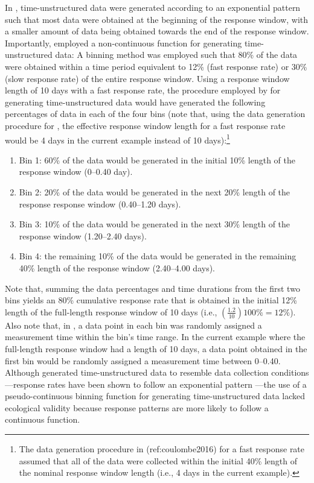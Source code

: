 \documentclass[
12pt, %
twoside,
english]{guelphthesis}
\begin{document}
In \textcite{coulombe2016}, time-unstructured data were generated according to an exponential pattern such that most data were obtained at the beginning of the response window, with a smaller amount of data being obtained towards the end of the response window. Importantly, \textcite{coulombe2016} employed a non-continuous function for generating time-unstructured data: A binning method was employed such that 80\% of the data were obtained within a time period equivalent to 12\% (fast response rate) or 30\% (slow response rate) of the entire response window. Using a response window length of 10 days with a fast response rate, the procedure employed by \textcite{coulombe2016} for generating time-unstructured data would have generated the following percentages of data in each of the four bins (note that, using the data generation procedure for \textcite{coulombe2016}, the effective response window length for a fast response rate would be 4 days in the current example instead of 10 days):\footnote{The data generation procedure in (ref:coulombe2016) for a fast response rate assumed that all of the data were collected within the initial 40\% length of the nominal response window length (i.e., 4 days in the current example).}
\begin{enumerate}
\def\labelenumi{\arabic{enumi})}
\tightlist
\item
  Bin 1: 60\% of the data would be generated in the initial 10\% length of the response window (0--0.40 day).
\item
  Bin 2: 20\% of the data would be generated in the next 20\% length of the response response window (0.40--1.20 days).
\item
  Bin 3: 10\% of the data would be generated in the next 30\% length of the response window (1.20--2.40 days).
\item
  Bin 4: the remaining 10\% of the data would be generated in the remaining 40\% length of the response window (2.40--4.00 days).
\end{enumerate}
\noindent Note that, summing the data percentages and time durations from the first two bins yields an 80\% cumulative response rate that is obtained in the initial 12\% length of the full-length response window of 10 days (i.e., \((\frac{1.2}{10})100\% = 12\%\)). Also note that, in \textcite{coulombe2016}, a data point in each bin was randomly assigned a measurement time within the bin's time range. In the current example where the full-length response window had a length of 10 days, a data point obtained in the first bin would be randomly assigned a measurement time between 0--0.40. Although \textcite{coulombe2016} generated time-unstructured data to resemble data collection conditions---response rates have been shown to follow an exponential pattern \autocite{dillman2014,pan2010}---the use of a pseudo-continuous binning function for generating time-unstructured data lacked ecological validity because response patterns are more likely to follow a continuous function.
\end{document}
